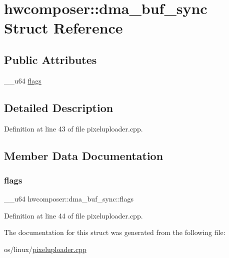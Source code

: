 \hypertarget{structhwcomposer_1_1dma__buf__sync}{}\section{hwcomposer\+:\+:dma\+\_\+buf\+\_\+sync Struct Reference}
\label{structhwcomposer_1_1dma__buf__sync}
\subsection*{Public Attributes}
\begin{DoxyCompactItemize}
\item 
\+\_\+\+\_\+u64 \mbox{\hyperlink{structhwcomposer_1_1dma__buf__sync_aa388bae6dfe6dbefb6a75336c20a98e1}{flags}}
\end{DoxyCompactItemize}


\subsection{Detailed Description}


Definition at line 43 of file pixeluploader.\+cpp.



\subsection{Member Data Documentation}
\mbox{\label{structhwcomposer_1_1dma__buf__sync_aa388bae6dfe6dbefb6a75336c20a98e1}} 
\subsubsection{\texorpdfstring{flags}{flags}}
{\footnotesize\ttfamily \+\_\+\+\_\+u64 hwcomposer\+::dma\+\_\+buf\+\_\+sync\+::flags}



Definition at line 44 of file pixeluploader.\+cpp.



The documentation for this struct was generated from the following file\+:\begin{DoxyCompactItemize}
\item 
os/linux/\mbox{\hyperlink{pixeluploader_8cpp}{pixeluploader.\+cpp}}\end{DoxyCompactItemize}
